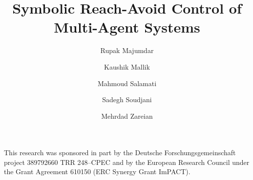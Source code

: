 \documentclass[sigconf,table]{acmart}
\title{Symbolic Reach-Avoid Control of Multi-Agent Systems}
\author{Rupak Majumdar}
\affiliation{MPI-SWS, Germany.}
\author{Kaushik Mallik}
\affiliation{MPI-SWS, Germany.}
\author{Mahmoud Salamati}
\affiliation{MPI-SWS, Germany.}
\author{Sadegh Soudjani}
\affiliation{Newcastle University, UK.}
\author{Mehrdad Zareian}
\affiliation{MPI-SWS, Germany.}
\begin{document}
\begin{abstract}
	
\end{abstract}

\maketitle




	




\begin{acks}                            %
This research was sponsored in part by
the Deutsche Forschungsgemeinschaft project 389792660 TRR 248--CPEC
and by the European Research Council under the
Grant Agreement 610150
(ERC Synergy Grant ImPACT). 
\end{acks}




\newpage

\begin{appendix}

\end{appendix}
\end{document}
